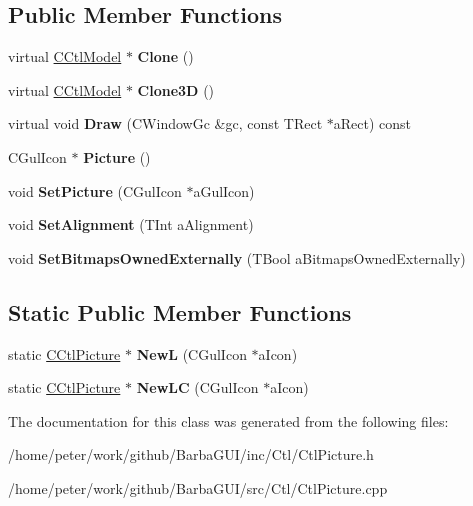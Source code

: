 \subsection*{Public Member Functions}
\begin{DoxyCompactItemize}
\item 
\mbox{\label{classCCtlPicture_ad59f0a33a23ec38be2b723d49b29c757}} 
virtual \hyperlink{classCCtlModel}{C\+Ctl\+Model} $\ast$ {\bfseries Clone} ()
\item 
\mbox{\label{classCCtlPicture_ae86c0d22494567c825c7a55a24b12a76}} 
virtual \hyperlink{classCCtlModel}{C\+Ctl\+Model} $\ast$ {\bfseries Clone3D} ()
\item 
\mbox{\label{classCCtlPicture_a09d0d083303eeec4b0869cc5e98f9540}} 
virtual void {\bfseries Draw} (C\+Window\+Gc \&gc, const T\+Rect $\ast$a\+Rect) const
\item 
\mbox{\label{classCCtlPicture_af1a750feab4e7f7073c59eaaac6fe643}} 
C\+Gul\+Icon $\ast$ {\bfseries Picture} ()
\item 
\mbox{\label{classCCtlPicture_ab9acc69bb200deccfe03c5d132f55902}} 
void {\bfseries Set\+Picture} (C\+Gul\+Icon $\ast$a\+Gul\+Icon)
\item 
\mbox{\label{classCCtlPicture_a047f1e2bf4cd6501f23fd7b3a551249e}} 
void {\bfseries Set\+Alignment} (T\+Int a\+Alignment)
\item 
\mbox{\label{classCCtlPicture_a6f503fb9691b8996fadf2a3c985641de}} 
void {\bfseries Set\+Bitmaps\+Owned\+Externally} (T\+Bool a\+Bitmaps\+Owned\+Externally)
\end{DoxyCompactItemize}
\subsection*{Static Public Member Functions}
\begin{DoxyCompactItemize}
\item 
\mbox{\label{classCCtlPicture_ae5436e48137a6d653778ffc9e1f288ff}} 
static \hyperlink{classCCtlPicture}{C\+Ctl\+Picture} $\ast$ {\bfseries NewL} (C\+Gul\+Icon $\ast$a\+Icon)
\item 
\mbox{\label{classCCtlPicture_a4afce1123e686d0f3df6de6ca8cd44e7}} 
static \hyperlink{classCCtlPicture}{C\+Ctl\+Picture} $\ast$ {\bfseries New\+LC} (C\+Gul\+Icon $\ast$a\+Icon)
\end{DoxyCompactItemize}


The documentation for this class was generated from the following files\+:\begin{DoxyCompactItemize}
\item 
/home/peter/work/github/\+Barba\+G\+U\+I/inc/\+Ctl/Ctl\+Picture.\+h\item 
/home/peter/work/github/\+Barba\+G\+U\+I/src/\+Ctl/Ctl\+Picture.\+cpp\end{DoxyCompactItemize}
